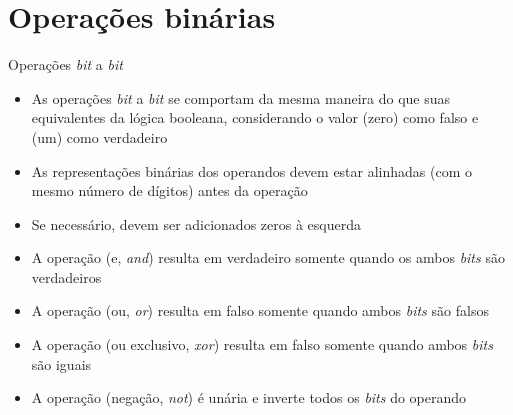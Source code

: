 \section*{Operações binárias}

\begin{frame}[fragile]{Operações {\it bit} a {\it bit}}

    \begin{itemize}
        \item As operações \textit{bit} a \textit{bit} se comportam da mesma maneira do que suas equivalentes da lógica booleana, considerando o valor 
(zero) como falso e  (um) como verdadeiro

        \item As representações binárias dos operandos devem estar alinhadas (com o mesmo número de dígitos) antes da operação

        \item Se necessário, devem ser adicionados zeros à esquerda

        \item A operação  (e, \textit{and}) resulta em verdadeiro somente quando os ambos \textit{bits} são verdadeiros 

        \item A operação  (ou, \textit{or}) resulta em falso somente quando ambos \textit{bits} são falsos

        \item A operação  (ou exclusivo, \textit{xor}) resulta em falso somente quando ambos \textit{bits} são iguais

        \item A operação  (negação, \textit{not}) é unária e inverte todos os \textit{bits} do operando
    \end{itemize}

\end{frame}

